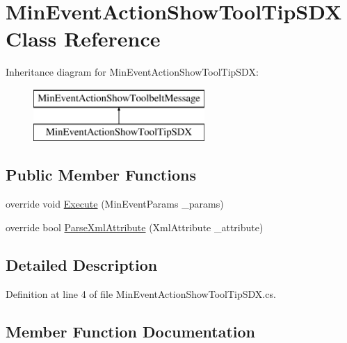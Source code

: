 \hypertarget{class_min_event_action_show_tool_tip_s_d_x}{}\section{Min\+Event\+Action\+Show\+Tool\+Tip\+S\+DX Class Reference}
\label{class_min_event_action_show_tool_tip_s_d_x}
Inheritance diagram for Min\+Event\+Action\+Show\+Tool\+Tip\+S\+DX\+:\begin{figure}[H]
\begin{center}
\leavevmode
\includegraphics[height=2.000000cm]{d2/d22/class_min_event_action_show_tool_tip_s_d_x}
\end{center}
\end{figure}
\subsection*{Public Member Functions}
\begin{DoxyCompactItemize}
\item 
override void \mbox{\hyperlink{class_min_event_action_show_tool_tip_s_d_x_ae614326ceff37a5fde7667d450296163}{Execute}} (Min\+Event\+Params \+\_\+params)
\item 
override bool \mbox{\hyperlink{class_min_event_action_show_tool_tip_s_d_x_a07a5eec000d2750a1f19132c192bbc4b}{Parse\+Xml\+Attribute}} (Xml\+Attribute \+\_\+attribute)
\end{DoxyCompactItemize}


\subsection{Detailed Description}


Definition at line 4 of file Min\+Event\+Action\+Show\+Tool\+Tip\+S\+D\+X.\+cs.



\subsection{Member Function Documentation}
\mbox{\label{class_min_event_action_show_tool_tip_s_d_x_ae614326ceff37a5fde7667d450296163}} 
